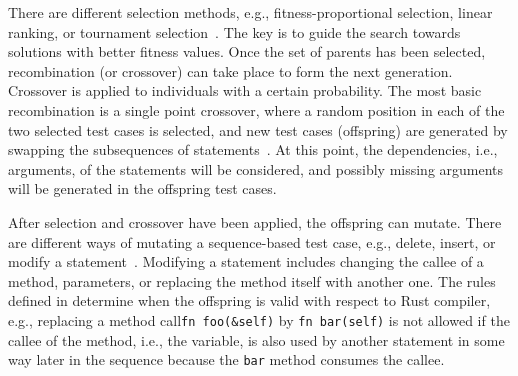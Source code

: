 \documentclass[paper=a4,%
  twoside,%
  BCOR4mm,%
  abstract=true,%
  toc=bibliography,%
  chapterprefix=true,%
  toc=bibliographynumbered,%
  open=right,%
  english,%
  pagesize=pdftex]{scrreprt}
\begin{document}
There are different selection methods, e.g., fitness-proportional selection, linear ranking, or tournament selection~\cite{McMinn_2004}. The key is to guide the search towards solutions with better fitness values. Once the set of parents has been selected, recombination (or crossover) can take place to form the next generation. Crossover is applied to individuals with a certain probability. The most basic recombination is a single point crossover, where a random position in each of the two selected test cases is selected, and new test cases (offspring) are generated by swapping the subsequences of statements~\cite{Fraser2012}. At this point, the dependencies, i.e., arguments, of the statements will be considered, and possibly missing arguments will be generated in the offspring test cases.

After selection and crossover have been applied, the offspring can mutate. There are different ways of mutating a sequence-based test case, e.g., delete, insert, or modify a statement~\cite{Fraser2012}. Modifying a statement includes changing the callee of a method, parameters, or replacing the method itself with another one. The rules defined in  determine when the offspring is valid with respect to Rust compiler, e.g., replacing a method call\lstinline{fn foo(&self)} by \lstinline{fn bar(self)} is not allowed if the callee of the method, i.e., the variable, is also used by another statement in some way later in the sequence because the \lstinline{bar} method consumes the callee.
\end{document}
